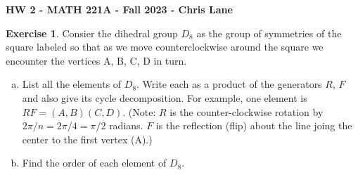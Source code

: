 \documentclass[11pt,oneside]{article}
\numberwithin{equation}{section}
\theoremstyle{definition}
\newtheorem{exercise}{Exercise}
\begin{document}
\textbf{HW 2 - MATH 221A - Fall 2023 - Chris Lane}

%   

\begin{exercise}
  Consier the dihedral group $D_8$ as the group of symmetries of the square labeled so that as we move counterclockwise around the square we encounter the vertices A, B, C, D in turn.
  \begin{enumerate}[(a)]
    \item
      List all the elements of $D_8$. Write each as a product of the
      generators $R$, $F$ and also give its cycle decomposition. For
      example, one element is $RF = (A, B)(C, D)$. (Note: $R$ is the
      counter-clockwise rotation by $2 \pi / n = 2 \pi / 4 = \pi / 2 $
      radians. $F$ is the reflection (flip) about the line joing the
      center to the first vertex (A).)
    \item
      Find the order of each element of $D_8$.
  \end{enumerate}
\end{exercise}
\end{document}
